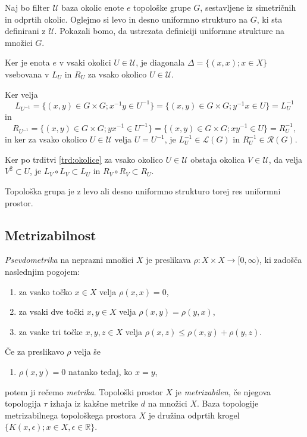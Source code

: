 \documentclass[mat1]{fmfdelo}
\newcommand{\R}{\mathbb R}
\newcommand{\Ucurl}{\mathcal{U}}
\begin{document}
\begin{dokaz}
Naj bo filter $\Ucurl$ baza okolic enote $e$ topološke grupe $G$, sestavljene iz simetričnih in odprtih okolic. Oglejmo si levo in desno uniformno strukturo na $G$, ki sta definirani z $\Ucurl$. Pokazali bomo, da ustrezata definiciji uniformne strukture na množici $G$.

Ker je enota $e$ v vsaki okolici $U \in \Ucurl$, je diagonala $\Delta = \lbrace (x, x) ; x \in X \rbrace$ vsebovana v $L_U$ in $R_U$ za vsako okolico $U \in \Ucurl$.

Ker velja \[L_{U^{-1}} = \lbrace (x, y) \in G \times G ; x^{-1}y \in U^{-1} \rbrace = \lbrace (x, y) \in G \times G ; y^{-1}x \in U \rbrace = L^{-1}_U\]
in
\[R_{U^{-1}} = \lbrace (x, y) \in G \times G ; yx^{-1} \in U^{-1} \rbrace = \lbrace (x, y) \in G \times G ; xy^{-1} \in U \rbrace = R^{-1}_U,\]
in ker za vsako okolico $U \in \Ucurl$ velja $U = U^{-1}$, je $L^{-1}_U \in \mathcal{L}(G)$ in $R^{-1}_U \in \mathcal{R}(G)$.

Ker po trditvi \ref{trd:okolice} za vsako okolico $U \in \Ucurl$ obstaja okolica $V \in \Ucurl$, da velja $V^2 \subset U$, je $L_V \circ L_V \subset L_U$ in $R_V \circ R_V \subset R_U$.

Topološka grupa je z levo ali desno uniformno strukturo torej res uniformni prostor.
\end{dokaz}

\subsection{Metrizabilnost}
\emph{Psevdometrika} na neprazni množici $X$ je preslikava $\rho\colon X\times X \to  [0, \infty)$, ki zadošča naslednjim pogojem:
\begin{enumerate}
\item za vsako točko $x \in X$ velja $\rho (x, x) = 0$,
\item za vsaki dve točki $x, y \in X$ velja $\rho (x, y) = \rho (y, x)$,
\item za vsake tri točke $x, y, z \in X$ velja $\rho (x, z) \leq \rho (x, y) + \rho (y, z)$.
\end{enumerate}
Če za preslikavo $\rho$ velja še
\begin{enumerate}[resume]
\item $\rho(x,y) = 0$ natanko tedaj, ko $x = y$,
\end{enumerate}
potem ji rečemo \emph{metrika}.
Topološki prostor $X$ je \emph{metrizabilen}, če njegova topologija $\tau$ izhaja iz kakšne metrike $d$ na množici $X$.
Baza topologije metrizabilnega topološkega prostora $X$ je družina odprtih krogel $\lbrace K(x, \epsilon); x \in X, \epsilon \in \R \rbrace$.
\end{document}
